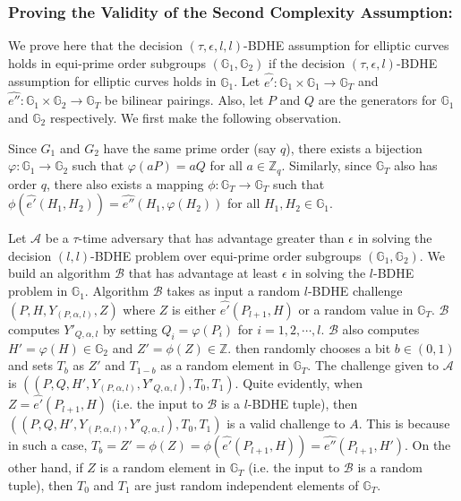 \subsubsection{Proving the Validity of the Second Complexity Assumption:}
\label{app_sec:hardness}

We prove here that the decision $(\tau,\epsilon,l,l)$-BDHE assumption for elliptic curves holds in equi-prime order subgroups $(\mathbb{G}_1,\mathbb{G}_2)$ if the decision $(\tau,\epsilon,l)$-BDHE assumption for elliptic curves holds in $\mathbb{G}_1$. Let $\hat{e'}:\mathbb{G}_1\times \mathbb{G}_1\longrightarrow\mathbb{G}_T$ and $\hat{e''}:\mathbb{G}_1\times \mathbb{G}_2\longrightarrow\mathbb{G}_T$ be bilinear pairings. Also, let $P$ and $Q$ are the generators for $\mathbb{G}_1$ and $\mathbb{G}_2$ respectively. We first make the following observation. 

 Since $G_1$ and $G_2$ have the same prime order (say $q$), there exists a bijection $\varphi:\mathbb{G}_1\longrightarrow\mathbb{G}_2$ such that $\varphi(aP)=aQ$ for all $a\in\mathbb{Z}_q$. Similarly, since $\mathbb{G}_T$ also has order $q$, there also exists a mapping $\phi:\mathbb{G}_T\longrightarrow\mathbb{G}_T$ such that $\phi(\hat{e'}(H_1,H_2))=\hat{e''}(H_1,\varphi(H_2))$ for all $H_1,H_2 \in \mathbb{G}_1$.

Let $\mathcal{A}$ be a $\tau$-time adversary that has advantage greater than $\epsilon$ in solving the decision $(l,l)$-BDHE problem over equi-prime order subgroups $(\mathbb{G}_1,\mathbb{G}_2)$. We build an algorithm $\mathcal{B}$ that has advantage at least $\epsilon$ in solving the $l$-BDHE problem in $\mathbb{G}_1$. Algorithm $\mathcal{B}$ takes as input a random $l$-BDHE challenge $(P,H,Y_{(P,\alpha,l)},Z)$ where $Z$ is either $\hat{e'}(P_{l+1},H)$ or a random value in $\mathbb{G}_T$. $\mathcal{B}$ computes $Y'_{Q,\alpha,l}$ by setting $Q_i=\varphi(P_i)$ for $i=1,2,\cdots,l$. $\mathcal{B}$ also computes $H'=\varphi(H)\in\mathbb{G}_2$ and $Z'=\phi(Z)\in\mathbb{Z}$. then randomly chooses a bit $b\in{(0,1)}$ and sets $T_b$ as $Z'$ and $T_{1-b}$ as a random element in $\mathbb{G}_T$. The challenge given to $\mathcal{A}$ is 
$((P,Q,H',Y_{(P,\alpha,l)},Y'_{Q,\alpha,l}),T_0,T_1)$. Quite evidently, when $Z=\hat{e'}(P_{l+1},H)$ (i.e. the input to $\mathcal{B}$ is a $l$-BDHE tuple), then $((P,Q,H',Y_{(P,\alpha,l)},Y'_{Q,\alpha,l}),T_0,T_1)$ is a valid challenge to $A$. This is because in such a case, $T_b=Z'=\phi(Z)=\phi(\hat{e'}(P_{l+1},H))=\hat{e''}(P_{l+1},H')$. On the other hand, if $Z$ is a random element in $\mathbb{G}_T$ (i.e. the input to $\mathcal{B}$ is a random tuple), then $T_0$ and $T_1$ are just random independent elements of $\mathbb{G}_T$.

